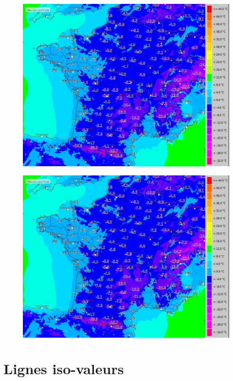 \documentclass{beamer}
\begin{document}
\begin{frame}
  \pause
  \begin{figure}
    \centering
    \includegraphics[width=\textwidth,height=0.8\textheight,keepaspectratio]{fig/meteo_fr_scales_temp}
  \end{figure}

  \pause
  \begin{figure}
    \centering
    \includegraphics[width=\textwidth,height=0.8\textheight,keepaspectratio]{fig/meteo_fr_scales_temp}
  \end{figure}
\end{frame}


\section[Isovaleurs]{Lignes iso-valeurs}
\end{document}
